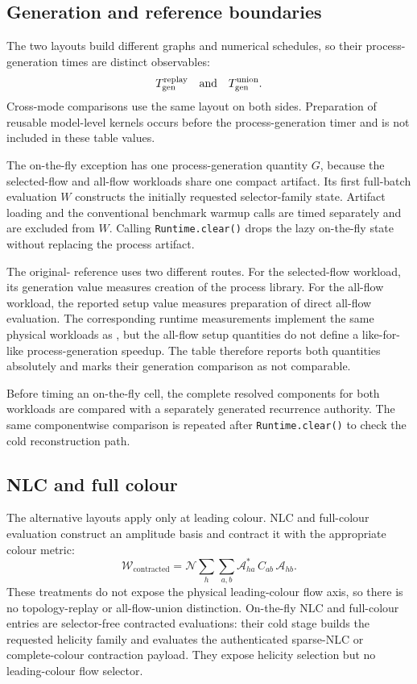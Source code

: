 \subsection{Generation and reference boundaries}

The two layouts build different graphs and numerical schedules, so their
process-generation times are distinct observables:
\begin{equation}
  T_{\mathrm{gen}}^{\mathrm{replay}}
  \quad\hbox{and}\quad
  T_{\mathrm{gen}}^{\mathrm{union}}.
  \label{eq:lc-two-generation-times}
\end{equation}
Cross-mode comparisons use the same layout on both sides.  Preparation of
reusable model-level kernels occurs before the process-generation timer and is
not included in these table values.

The on-the-fly exception has one process-generation quantity \(G\), because
the selected-flow and all-flow workloads share one compact artifact. Its first
full-batch evaluation \(W\) constructs the initially requested selector-family
state. Artifact loading and the conventional benchmark warmup calls are timed
separately and are excluded from \(W\). Calling \texttt{Runtime.clear()} drops
the lazy on-the-fly state without replacing the process artifact.

The original-\AC{} reference uses two different routes. For the selected-flow
workload, its generation value measures creation of the process library. For
the all-flow workload, the reported setup value measures preparation of direct
all-flow evaluation. The corresponding runtime measurements implement the
same physical workloads as \PAC{}, but the all-flow setup quantities do not
define a like-for-like process-generation speedup. The table therefore reports
both quantities absolutely and marks their generation comparison as not
comparable.

Before timing an on-the-fly cell, the complete resolved components for both
workloads are compared with a separately generated recurrence authority. The
same componentwise comparison is repeated after
\texttt{Runtime.clear()} to check the cold reconstruction path.

\subsection{NLC and full colour}

The alternative layouts apply only at leading colour.  NLC and full-colour
evaluation construct an amplitude basis and contract it with the appropriate
colour metric:
\begin{equation}
  \mathcal W_{\mathrm{contracted}}
  =\mathcal N\sum_h\sum_{a,b}
   \mathcal A_{ha}^{*}\,C_{ab}\,\mathcal A_{hb}.
  \label{eq:contracted-colour-layout}
\end{equation}
These treatments do not expose the physical leading-colour flow axis, so there
is no topology-replay or all-flow-union distinction. On-the-fly NLC and
full-colour entries are selector-free contracted evaluations: their cold stage
builds the requested helicity family and evaluates the authenticated sparse-NLC
or complete-colour contraction payload. They expose helicity selection but no
leading-colour flow selector.
